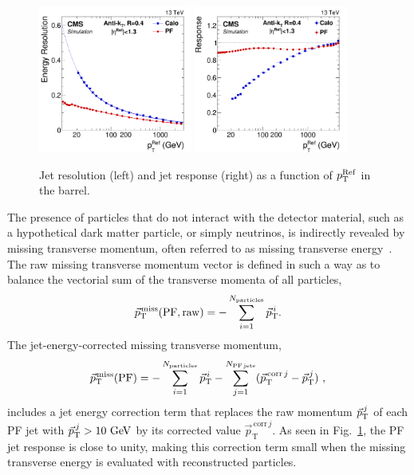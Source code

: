 \begin{figure}[htbp]
  \centering 
  \includegraphics[width=0.45\textwidth]{figs/cms/RelResVsRefPt_Barrel_AK4CaloL2L3_AK4PFL2L3_no2000.pdf}
  \includegraphics[width=0.45\textwidth]{figs/cms/ClosureRatioVsRefPt_RefEta0to1dot3_ak4caloOverak4pf_no2000.pdf}
  \caption{Jet \pt resolution (left) and jet \pt response (right) as a function of $p_{\mathrm{T}}^{\mathrm{Ref}}$ in the barrel.\label{fig:expected_performance_jets}}
\end{figure}

The presence of particles that do not interact with the detector
material, such as a hypothetical dark matter particle, or simply
neutrinos, is indirectly revealed by missing transverse momentum,
often referred to as missing transverse energy~\cite{Khachatryan:2014gga}. The raw missing transverse momentum
vector is defined in such a way as to balance the vectorial sum of the
transverse momenta of all particles,
\begin{equation}
  {\vec p}_{\mathrm{T}}^{\kern1pt\text{miss}} ({\mathrm{PF, raw}}) = - \sum_{i=1}^{N_{\mathrm{particles}}} {\vec p}_{\mathrm{T}}^{\,i}.
\end{equation}
The jet-energy-corrected missing transverse momentum,
\begin{equation}
  {\vec p}_{\mathrm{T}}^{\kern1pt\text{miss}} ({\mathrm{PF}}) = - \sum_{i=1}^{N_{\mathrm{particles}}}
  {\vec p}_{\mathrm{T}}^{\,i} - \sum_{j=1}^{N_{\mathrm{PF\,jets}}} ({\vec p^{\,\mathrm{corr}\,j}_{\mathrm T}} - {\vec p}_{\mathrm{T}}^{\,j})~,
\end{equation}
includes a jet energy correction term that replaces the raw momentum
${\vec p}_{\mathrm{T}}^{\,j}$  of each PF jet with ${\vec p}_{\mathrm{T}}^{\,j} >10\,\,\text{Ge\hspace{-.08em}V}$ by its
corrected value $\vec p^{\,\mathrm{corr}\,j}_{{\mathrm T}}$.
As seen in Fig.~\ref{fig:expected_performance_jets}, the
PF jet response is close to unity, making this correction term small
when the missing transverse energy is evaluated with reconstructed
particles.

